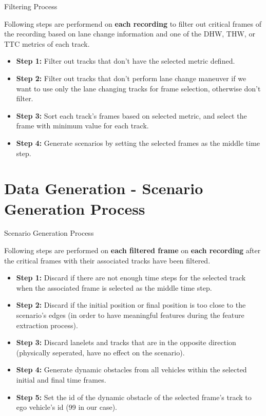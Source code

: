 \documentclass[shortpres]{beamer}
\begin{document}
\begin{frame}{Filtering Process}	

Following steps are performend on \textbf{each recording} to filter out critical frames of the recording based on lane change information and one of the DHW, THW, or TTC metrics of each track.\\

\begin{itemize} 
\item \textbf{Step 1:} Filter out tracks that don't have the selected metric defined.
\item \textbf{Step 2:} Filter out tracks that don't perform lane change maneuver if we want to use only the lane changing tracks for frame selection, otherwise don't filter.
\item \textbf{Step 3:} Sort each track's frames based on selected metric, and select the frame with minimum value for each track.
\item \textbf{Step 4:} Generate scenarios by setting the selected frames as the middle time step.
\end{itemize}

\end{frame}

\section{Data Generation - Scenario Generation Process}	

\begin{frame}{Scenario Generation Process}	

Following steps are performed on \textbf{each filtered frame} on \textbf{each recording} after the critical frames with their associated tracks have been filtered.\\

\begin{itemize} 
\item \textbf{Step 1:} Discard if there are not enough time steps for the selected track when the associated frame is selected as the middle time step.
\item \textbf{Step 2:} Discard if the initial position or final position is too close to the scenario's edges (in order to have meaningful features during the feature extraction process).
\item \textbf{Step 3:} Discard lanelets and tracks that are in the opposite direction (physically seperated, have no effect on the scenario).
\item \textbf{Step 4:} Generate dynamic obstacles from all vehicles within the selected initial and final time frames.
\item \textbf{Step 5:} Set the id of the dynamic obstacle of the selected frame's track to ego vehicle's id (99 in our case).
\end{itemize}

\end{frame}
\end{document}
